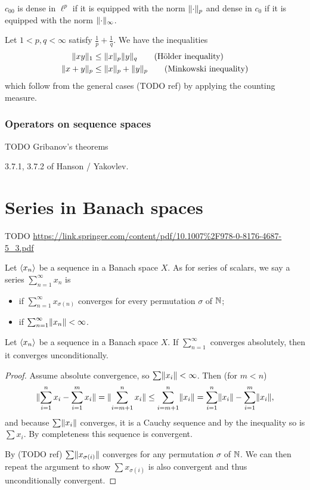 \begin{lemma}
$c_{00}$ is dense in $\ell^p$ if it is equipped with the norm $\lVert\cdot\rVert_p$ and dense in $c_0$ if it is equipped with the norm $\lVert\cdot\rVert_\infty$.
\end{lemma}

Let $1<p,q<\infty$ satisfy $\frac{1}{p}+\frac{1}{q}$. We have the inequalities
\begin{align*}
\lVert xy\rVert_1 &\leq \lVert x\rVert_p\lVert y\rVert_q\qquad\text{(Hölder inequality)} \\
\lVert x+y\rVert_p &\leq \lVert x\rVert_p+\lVert y\rVert_p\qquad\text{(Minkowski inequality)}
\end{align*}
which follow from the general cases (TODO ref) by applying the counting measure.

\subsubsection{Operators on sequence spaces}
TODO Gribanov's theorems

3.7.1, 3.7.2 of Hanson / Yakovlev.

\section{Series in Banach spaces}
TODO
\url{https://link.springer.com/content/pdf/10.1007%2F978-0-8176-4687-5_3.pdf}
\begin{definition}
Let $\left\langle x_n \right\rangle$ be a sequence in a Banach space $X$. As for series of scalars, we say a series $\sum_{n=1}^\infty x_n$ is
\begin{itemize}
\item {} if $\sum_{n=1}^\infty x_{\sigma(n)}$ converges for every permutation $\sigma$ of $\mathbb{N}$;
\item {} if $\sum_{n=1}^\infty \lVert x_n\rVert < \infty$.
\end{itemize}
\end{definition}

\begin{proposition} \label{absoluteUnconditionalConvergenceBanach}
Let $\left\langle x_n \right\rangle$ be a sequence in a Banach space $X$. If $\sum_{n=1}^\infty$ converges absolutely, then it converges unconditionally.
\end{proposition}
\begin{proof}
Assume absolute convergence, so $\sum\lVert x_i\rVert<\infty$. Then (for $m< n$)
\[ \lVert\sum_{i=1}^n x_i - \sum_{i=1}^m x_i\rVert = \lVert\sum_{i=m+1}^n x_i\rVert \leq \sum_{i=m+1}^n\lVert x_i\rVert = \sum_{i=1}^n \lVert x_i\rVert - \sum_{i=1}^m \lVert x_i\rVert, \]
and because $\sum\lVert x_i\rVert$ converges, it is a Cauchy sequence and by the inequality so is $\sum x_i$. By completeness this sequence is convergent.

By (TODO ref) $\sum\lVert x_{\sigma(i)}\rVert$ converges for any permutation $\sigma$ of $\mathbb{N}$. We can then repeat the argument to show $\sum x_{\sigma(i)}$ is also convergent and thus unconditionally convergent.
\end{proof}

